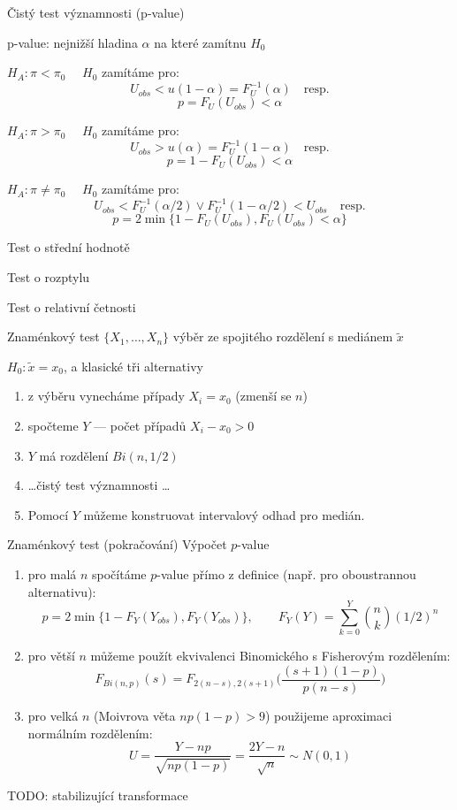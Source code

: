 \documentclass[smaller]{beamer}
\def\blue#1{{\usebeamercolor[fg]{my blue} #1}}
\def\xskip{{\vspace{2ex}}}
\begin{document}
\begin{frame}{Čistý test významnosti (p-value)}

{\df p-value}: nejnižší hladina $\alpha$ na které zamítnu $H_0$

\xskip
\blue{$H_A: \pi < \pi_0$} $\quad H_0$ zamítáme pro:
\[ U_{obs} < u(1-\alpha) = F^{-1}_U (\alpha) \quad \text{resp.}\]
\[ p=F_U(U_{obs}) <\alpha \]

\xskip
\blue{$H_A: \pi > \pi_0$} $\quad H_0$ zamítáme pro:
\[ U_{obs} > u(\alpha) = F^{-1}_U (1-\alpha) \quad \text{resp.}\]
\[ p=1-F_U(U_{obs}) <\alpha\]

\xskip
\blue{$H_A: \pi \ne \pi_0$} $\quad H_0$ zamítáme pro:
\[ U_{obs} < F^{-1}_U (\alpha/2) \vee F^{-1}_U (1-\alpha/2)< U_{obs} \quad \text{resp.}\]
\[ p= 2\min\{1-F_U(U_{obs}) , F_U(U_{obs}) < \alpha\}\]   
\end{frame}

\begin{frame}{Test o střední hodnotě}
\end{frame}

\begin{frame}{Test o rozptylu}
\end{frame}

\begin{frame}{Test o relativní četnosti}
\end{frame}

\begin{frame}{Znaménkový test}
$\{X_1,\dots,X_n\}$ výběr ze spojitého rozdělení s mediánem $\tilde{x}$

$H_0: \tilde{x} = x_0$, a klasické tři alternativy

\begin{enumerate}
 \item z výběru vynecháme případy $X_i = x_0$ (zmenší se $n$)
 \item spočteme $Y$ --- počet případů $X_i -x_0 > 0$
 \item $Y$ má rozdělení $Bi(n, 1/2)$
 \item \dots čistý test významnosti \dots
 \item Pomocí $Y$ můžeme konstruovat intervalový odhad pro medián.
\end{enumerate}
\end{frame}
\begin{frame}{Znaménkový test (pokračování)}
Výpočet $p$-value
\begin{enumerate}
 \item pro malá $n$ spočítáme $p$-value přímo z definice (např. pro oboustrannou alternativu):
  \[
     p=2 \min\{1-F_Y(Y_{obs}), F_Y(Y_{obs})\}, \qquad F_Y(Y) = \sum_{k=0}^{Y} \binom{n}{k} (1/2)^n
  \]
 \item pro větší $n$ můžeme použít ekvivalenci Binomického s Fisherovým rozdělením:
  \[
     F_{Bi(n,p)}(s) = F_{2(n-s),2(s+1)} \Big(\frac{(s+1)(1-p)}{p(n-s)}\Big)
  \]
 \item pro velká $n$ (Moivrova věta $np(1-p) >9$) použijeme aproximaci normálním rozdělením:
 \[
    U = \frac{Y - np}{\sqrt{np(1-p)}} = \frac{2Y -n}{\sqrt{n}} \sim N(0,1)
 \]
\end{enumerate}
TODO: stabilizující transformace
\end{frame}
\end{document}
